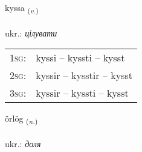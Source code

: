 \documentclass[frontgrid, backgrid]{flacards}\usepackage[]{graphicx}\usepackage[]{xcolor}
\begin{document}
\renewcommand{\flhead}{\vskip5pt \fboxsep=0pt {\small\bfseries\footnotesize Sagnorð | дієслово}}
\renewcommand{\fcfoot}{\vskip5pt \fboxsep=0pt \hspace{2pt}{\small\bfseries\footnotesize 3K}}

\renewcommand{\blhead}{\vskip5pt {\small\bfseries\footnotesize Sagnorð | дієслово }}
\renewcommand{\bcfoot}{\vskip5pt \hspace{2pt}{\small\bfseries\footnotesize 3K}}


{kyssa \small{\textsubscript{(\textit{v.})}} \\[1ex] %
\textphonetic{[cʰɪsa]} \\
ukr.: \emph{цілувати} \\  [2ex]
\renewcommand*{\arraystretch}{0.8}
\begin{tabular}{p{1cm}l}
\textsc{1sg}: & kyssi -- kyssti -- kysst \\ 
\textsc{2sg}: & kyssir -- kysstir -- kysst \\ 
\textsc{3sg}: & kyssir -- kyssti -- kysst \\ 
\end{tabular}
}

\renewcommand{\flhead}{\vskip5pt \fboxsep=0pt {\small\bfseries\footnotesize Nafnorð | іменник}}
\renewcommand{\fcfoot}{\vskip5pt \fboxsep=0pt \hspace{2pt}{\small\bfseries\footnotesize 3K}}

\renewcommand{\blhead}{\vskip5pt {\small\bfseries\footnotesize Nafnorð | іменник }}
\renewcommand{\bcfoot}{\vskip5pt \hspace{2pt}{\small\bfseries\footnotesize 3K}}


{örlög \small{\textsubscript{(\textit{n.})}} \\[1ex] %
\textphonetic{[œrlœɣ]} \\
ukr.: \emph{доля} \\  [2ex]
\renewcommand*{\arraystretch}{0.8}
}
\end{document}
